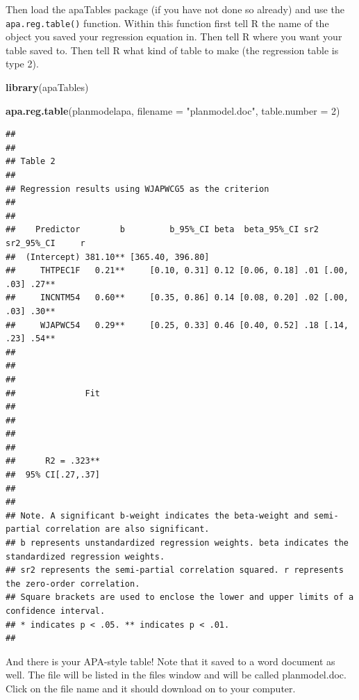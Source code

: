 \documentclass[
]{book}
\newenvironment{Shaded}{\begin{snugshade}}{\end{snugshade}}
\newcommand{\DataTypeTok}[1]{\textcolor[rgb]{0.13,0.29,0.53}{#1}}
\newcommand{\DecValTok}[1]{\textcolor[rgb]{0.00,0.00,0.81}{#1}}
\newcommand{\KeywordTok}[1]{\textcolor[rgb]{0.13,0.29,0.53}{\textbf{#1}}}
\newcommand{\NormalTok}[1]{#1}
\newcommand{\StringTok}[1]{\textcolor[rgb]{0.31,0.60,0.02}{#1}}
\begin{document}
Then load the apaTables package (if you have not done so already) and use the \texttt{apa.reg.table()} function. Within this function first tell R the name of the object you saved your regression equation in. Then tell R where you want your table saved to. Then tell R what kind of table to make (the regression table is type 2).

\begin{Shaded}
\begin{Highlighting}[]
\KeywordTok{library}\NormalTok{(apaTables)}

\KeywordTok{apa.reg.table}\NormalTok{(planmodelapa, }\DataTypeTok{filename =} \StringTok{"planmodel.doc"}\NormalTok{, }\DataTypeTok{table.number =} \DecValTok{2}\NormalTok{)}
\end{Highlighting}
\end{Shaded}

\begin{verbatim}
## 
## 
## Table 2 
## 
## Regression results using WJAPWCG5 as the criterion
##  
## 
##    Predictor        b         b_95%_CI beta  beta_95%_CI sr2 sr2_95%_CI     r
##  (Intercept) 381.10** [365.40, 396.80]                                       
##     THTPEC1F   0.21**     [0.10, 0.31] 0.12 [0.06, 0.18] .01 [.00, .03] .27**
##     INCNTM54   0.60**     [0.35, 0.86] 0.14 [0.08, 0.20] .02 [.00, .03] .30**
##     WJAPWC54   0.29**     [0.25, 0.33] 0.46 [0.40, 0.52] .18 [.14, .23] .54**
##                                                                              
##                                                                              
##                                                                              
##              Fit
##                 
##                 
##                 
##                 
##      R2 = .323**
##  95% CI[.27,.37]
##                 
## 
## Note. A significant b-weight indicates the beta-weight and semi-partial correlation are also significant.
## b represents unstandardized regression weights. beta indicates the standardized regression weights. 
## sr2 represents the semi-partial correlation squared. r represents the zero-order correlation.
## Square brackets are used to enclose the lower and upper limits of a confidence interval.
## * indicates p < .05. ** indicates p < .01.
## 
\end{verbatim}

And there is your APA-style table! Note that it saved to a word document as well. The file will be listed in the files window and will be called planmodel.doc. Click on the file name and it should download on to your computer.
\end{document}
